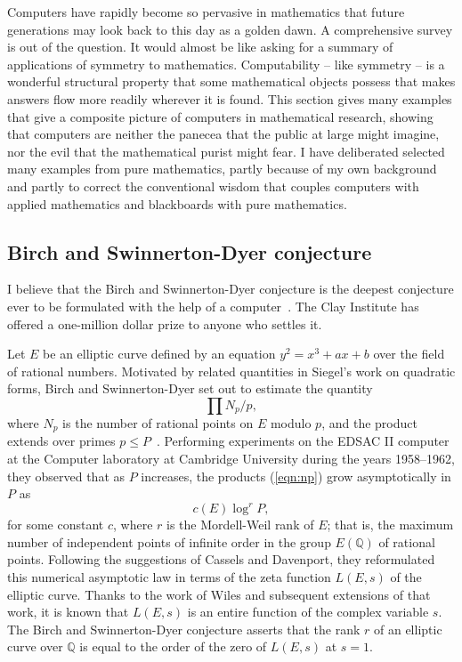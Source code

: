 \documentclass{llncs}
\newcommand{\ring}[1]{\mathbb{#1}}
\begin{document}
\bigskip

Computers have rapidly become so pervasive in mathematics that future
generations may look back to this day as a golden dawn.  A
comprehensive survey is out of the question.  It would almost be like
asking for a summary of applications of symmetry to mathematics.
Computability -- like symmetry -- is a wonderful structural property
that some mathematical objects possess that makes answers flow more
readily wherever it is found.  This section gives many examples that
give a composite picture of computers in mathematical research,
showing that computers are neither the panecea that the public at
large might imagine, nor the evil that the mathematical purist might
fear.  I have deliberated selected many examples from pure
mathematics, partly because of my own background and partly to correct
the conventional wisdom that couples computers with applied
mathematics and blackboards with pure mathematics.


\subsection{Birch and Swinnerton-Dyer conjecture}

I believe that the Birch and Swinnerton-Dyer conjecture is the deepest
conjecture ever to be formulated with the help of a computer~\cite{BSD}.  The
Clay Institute has offered a one-million dollar prize to anyone who
settles it.

Let $E$  be an elliptic curve defined by
an equation $y^2 = x^3 + a x + b$ 
over the field of rational
numbers.  Motivated by related quantities in Siegel's work on quadratic forms, Birch and Swinnerton-Dyer set out to estimate the quantity
\begin{equation}\label{eqn:np}
\prod {N_p/p},
\end{equation}
where $N_p$ is the number of rational points on $E$ modulo $p$, and
the product extends over primes $p\le P$~\cite{Bir}.  Performing
experiments on the EDSAC II computer at the Computer laboratory at Cambridge University during the years 1958--1962, they observed that as $P$ increases, the products (\ref{eqn:np})
grow asymptotically in $P$ as 
\[
c(E) \log^r P,
\]
for some constant $c$, where $r$ is the Mordell-Weil rank of $E$; that
is, the maximum number of independent points of infinite order in the
group $E(\ring{Q})$ of rational points.  Following the suggestions of
Cassels and Davenport, they reformulated this numerical asymptotic law in
terms of the zeta function $L(E,s)$ of the elliptic curve.  Thanks to the work of Wiles
and subsequent extensions of that
work, it is known that $L(E,s)$ is an entire function of the complex
variable $s$.  The Birch and Swinnerton-Dyer conjecture asserts that
the rank $r$ of an elliptic curve over $\ring{Q}$ is equal to the
order of the zero of $L(E,s)$ at $s=1$.
\end{document}
